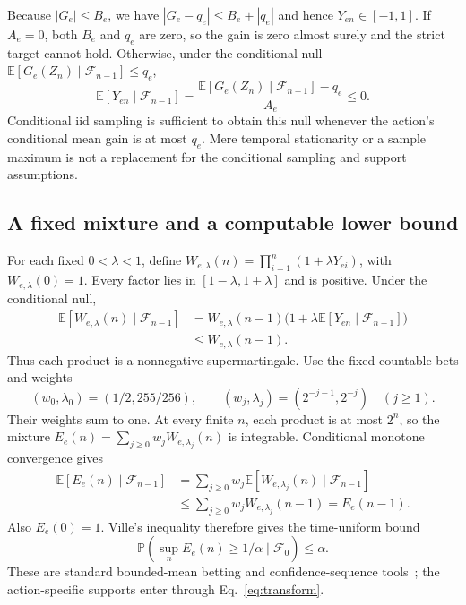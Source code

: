\documentclass[11pt]{article}
\newcommand{\E}{\mathbb E}
\newcommand{\Prb}{\mathbb P}
\newcommand{\F}{\mathcal F}
\begin{document}
Because $|G_e|\le B_e$, we have $|G_e-q_e|\le B_e+|q_e|$ and hence $Y_{en}\in[-1,1]$. If $A_e=0$, both $B_e$ and $q_e$ are zero, so the gain is zero almost surely and the strict target cannot hold. Otherwise, under the conditional null $\E[G_e(Z_n)\mid\F_{n-1}]\le q_e$,
\begin{equation}
 \E[Y_{en}\mid\F_{n-1}]=\frac{\E[G_e(Z_n)\mid\F_{n-1}]-q_e}{A_e}\le0.
\end{equation}
Conditional iid sampling is sufficient to obtain this null whenever the action's conditional mean gain is at most $q_e$. Mere temporal stationarity or a sample maximum is not a replacement for the conditional sampling and support assumptions.

\subsection{A fixed mixture and a computable lower bound}
For each fixed $0<\lambda<1$, define $W_{e,\lambda}(n)=\prod_{i=1}^n(1+\lambda Y_{ei})$, with $W_{e,\lambda}(0)=1$. Every factor lies in $[1-\lambda,1+\lambda]$ and is positive. Under the conditional null,
\begin{align}
 \E[W_{e,\lambda}(n)\mid\F_{n-1}]
 &=W_{e,\lambda}(n-1)\bigl(1+\lambda\E[Y_{en}\mid\F_{n-1}]\bigr)\\
 &\le W_{e,\lambda}(n-1).
\end{align}
Thus each product is a nonnegative supermartingale. Use the fixed countable bets and weights
\begin{equation}
 (w_0,\lambda_0)=(1/2,255/256),\qquad
 (w_j,\lambda_j)=(2^{-j-1},2^{-j})\quad(j\ge1).
\end{equation}
Their weights sum to one. At every finite $n$, each product is at most $2^n$, so the mixture $E_e(n)=\sum_{j\ge0}w_jW_{e,\lambda_j}(n)$ is integrable. Conditional monotone convergence gives
\begin{align}
 \E[E_e(n)\mid\F_{n-1}]
 &=\sum_{j\ge0}w_j\E[W_{e,\lambda_j}(n)\mid\F_{n-1}]\\
 &\le\sum_{j\ge0}w_jW_{e,\lambda_j}(n-1)=E_e(n-1).
\end{align}
Also $E_e(0)=1$. Ville's inequality therefore gives the time-uniform bound
\begin{equation}
 \Prb\!\left(\sup_n E_e(n)\ge1/\alpha\mid\F_0\right)\le\alpha.
 \label{eq:ville}
\end{equation}
These are standard bounded-mean betting and confidence-sequence tools~\cite{howard2021confidence,waudbysmith2024betting}; the action-specific supports enter through Eq.~\eqref{eq:transform}.
\end{document}
